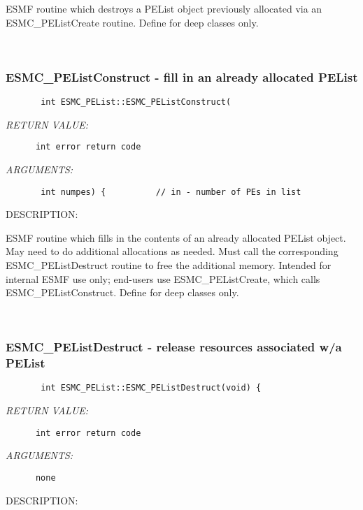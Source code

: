         ESMF routine which destroys a PEList object previously allocated
        via an ESMC\_PEListCreate routine.  Define for deep classes only.
   
 
\mbox{}\hrulefill\ 
 
\subsubsection{ESMC\_PEListConstruct - fill in an already allocated PEList}


  
\begin{verbatim}       int ESMC_PEList::ESMC_PEListConstruct(\end{verbatim}{\em RETURN VALUE:}
\begin{verbatim}      int error return code\end{verbatim}{\em ARGUMENTS:}
\begin{verbatim}       int numpes) {          // in - number of PEs in list\end{verbatim}
{\sf DESCRIPTION:\\ }


        ESMF routine which fills in the contents of an already
        allocated PEList object.  May need to do additional allocations
        as needed.  Must call the corresponding ESMC\_PEListDestruct
        routine to free the additional memory.  Intended for internal
        ESMF use only; end-users use ESMC\_PEListCreate, which calls
        ESMC\_PEListConstruct.  Define for deep classes only.
   
 
\mbox{}\hrulefill\ 
 
\subsubsection{ESMC\_PEListDestruct - release resources associated w/a PEList}


  
\begin{verbatim}       int ESMC_PEList::ESMC_PEListDestruct(void) {\end{verbatim}{\em RETURN VALUE:}
\begin{verbatim}      int error return code\end{verbatim}{\em ARGUMENTS:}
\begin{verbatim}      none\end{verbatim}
{\sf DESCRIPTION:\\ }


